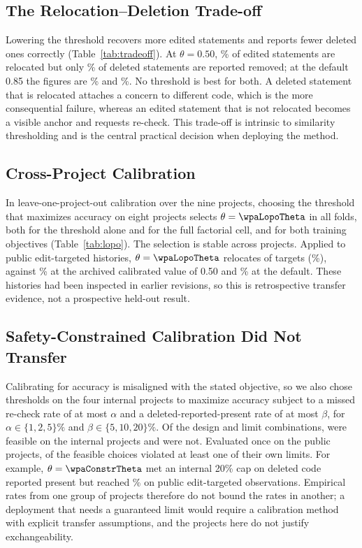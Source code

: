 \subsection{The Relocation--Deletion Trade-off}
Lowering the threshold recovers more edited statements and reports fewer deleted ones correctly (Table~\ref{tab:tradeoff}). At $\theta=0.50$, \thetaEditedFifty\% of edited statements are relocated but only \thetaGoneFifty\% of deleted statements are reported removed; at the default 0.85 the figures are \thetaEditedEightyFive\% and \thetaGoneEightyFive\%. No threshold is best for both. A deleted statement that is relocated attaches a concern to different code, which is the more consequential failure, whereas an edited statement that is not relocated becomes a visible  anchor and requests re-check. This trade-off is intrinsic to similarity thresholding and is the central practical decision when deploying the method.

\subsection{Cross-Project Calibration}
In leave-one-project-out calibration over the nine projects, choosing the threshold that maximizes accuracy on eight projects selects $\theta=\wpaLopoTheta$ in all \wpaLopoFolds{} folds, both for the threshold alone and for the full factorial cell, and for both training objectives (Table~\ref{tab:lopo}). The selection is stable across projects. Applied to public edit-targeted histories, $\theta=\wpaLopoTheta$ relocates \smPubTgtLopoAccK{} of \smPubTgtLopoAccN{} targets (\smPubTgtLopoAccPct\%), against \smPubTgtCalAccPct\% at the archived calibrated value of 0.50 and \smPubTgtCasAccPct\% at the default. These histories had been inspected in earlier revisions, so this is retrospective transfer evidence, not a prospective held-out result.

\subsection{Safety-Constrained Calibration Did Not Transfer}
Calibrating for accuracy is misaligned with the stated objective, so we also chose thresholds on the four internal projects to maximize accuracy subject to a missed re-check rate of at most $\alpha$ and a deleted-reported-present rate of at most $\beta$, for $\alpha\in\{1,2,5\}\%$ and $\beta\in\{5,10,20\}\%$. Of the design and limit combinations, \wpaConstrFeasible{} were feasible on the internal projects and \wpaConstrInfeasible{} were not. Evaluated once on the public projects, \wpaConstrViolate{} of the \wpaConstrFeasible{} feasible choices violated at least one of their own limits. For example, $\theta=\wpaConstrTheta$ met an internal 20\% cap on deleted code reported present but reached \wpaConstrPubGonePresent\% on public edit-targeted observations. Empirical rates from one group of projects therefore do not bound the rates in another; a deployment that needs a guaranteed limit would require a calibration method with explicit transfer assumptions, and the projects here do not justify exchangeability.

